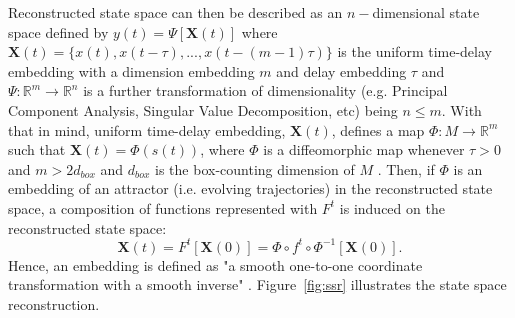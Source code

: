 Reconstructed state space can then be described as an $n-$dimensional state 
space defined by $y(t)=\Psi[\boldsymbol{X}(t)]$ where 
$\boldsymbol{X}(t) = \{ x(t), x(t-\tau) , ...,x(t - (m-1)\tau  ) \}$ is the 
uniform time-delay embedding with a dimension embedding $m$ and delay 
embedding $\tau$ and $ \Psi: \mathbb{R}^m \rightarrow \mathbb{R}^n$ is a 
further transformation of dimensionality (e.g. Principal Component Analysis, 
Singular Value Decomposition, etc) being $n \leq m$. With that in mind, 
uniform time-delay embedding, $\boldsymbol{X}(t)$, defines a map 
$\Phi: M \rightarrow \mathbb{R}^m$ such that $\boldsymbol{X}(t) = \Phi(s(t))$,
where $\Phi$ is a diffeomorphic map \citep{takens1981} whenever $\tau > 0$ 
and $m > 2d_{box}$ and $d_{box}$ is the box-counting dimension of 
$M$ \citep{garland2016}.
Then, if $\Phi$ is an embedding of an attractor (i.e. evolving 
trajectories) in the reconstructed state space, a composition of functions 
represented with $F^t$ is induced on the reconstructed state space:
\begin{equation}\label{eq:st}
  \boldsymbol{X}(t)=F^t [\boldsymbol{X}(0)] = \Phi \circ f^t \circ \Phi ^{-1}[\boldsymbol{X}(0)].
\end{equation}
Hence, an embedding is defined as "a smooth one-to-one coordinate 
transformation with a smooth inverse" \citep[p. 54]{casdagli1991}. 
Figure~\ref{fig:ssr} illustrates the state space reconstruction.
